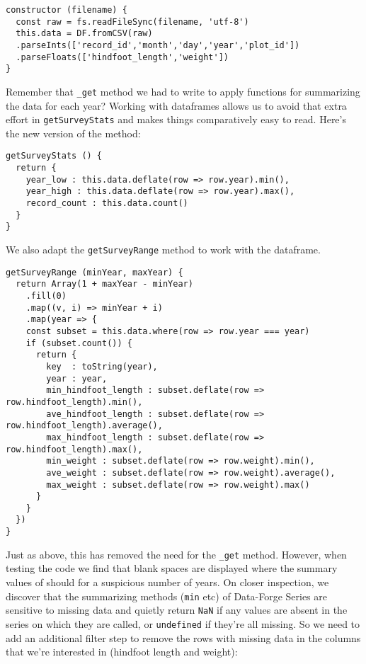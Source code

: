 \begin{verbatim}
constructor (filename) {
  const raw = fs.readFileSync(filename, 'utf-8')
  this.data = DF.fromCSV(raw)
  .parseInts(['record_id','month','day','year','plot_id'])
  .parseFloats(['hindfoot_length','weight'])
}
\end{verbatim}

Remember that \texttt{\_get} method we had to write
to apply functions for summarizing the data for each year?
Working with dataframes allows us to avoid that extra effort
in \texttt{getSurveyStats}
and makes things comparatively easy to read.
Here's the new version of the method:

\begin{verbatim}
getSurveyStats () {
  return {
    year_low : this.data.deflate(row => row.year).min(),
    year_high : this.data.deflate(row => row.year).max(),
    record_count : this.data.count()
  }
}
\end{verbatim}

We also adapt the \texttt{getSurveyRange} method
to work with the dataframe.

\begin{verbatim}
getSurveyRange (minYear, maxYear) {
  return Array(1 + maxYear - minYear)
    .fill(0)
    .map((v, i) => minYear + i)
    .map(year => {
    const subset = this.data.where(row => row.year === year)
    if (subset.count()) {
      return {
        key  : toString(year),
        year : year,
        min_hindfoot_length : subset.deflate(row => row.hindfoot_length).min(),
        ave_hindfoot_length : subset.deflate(row => row.hindfoot_length).average(),
        max_hindfoot_length : subset.deflate(row => row.hindfoot_length).max(),
        min_weight : subset.deflate(row => row.weight).min(),
        ave_weight : subset.deflate(row => row.weight).average(),
        max_weight : subset.deflate(row => row.weight).max()
      }
    }
  })
}
\end{verbatim}

Just as above,
this has removed the need for the \texttt{\_get} method.
However, when testing the code we find
that blank spaces are displayed where
the summary values of should for a suspicious number of years.
On closer inspection,
we discover that the summarizing methods
(\texttt{min} etc)
of Data-Forge Series are sensitive to missing data
and quietly return \texttt{NaN}
if any values are absent in the series
on which they are called,
or \texttt{undefined} if they're all missing.
So we need to add an additional filter step
to remove the rows with missing data in the columns
that we're interested in (hindfoot length and weight):

